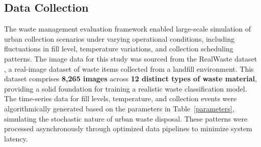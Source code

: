 \documentclass[final,5p,times,twocolumn]{elsarticle}
\begin{document}
\begin{table}[h!]
\centering
\caption{Smart Waste Management System Parameters}\label{parameters}
\end{table}


\subsection{Data Collection}
The waste management evaluation framework enabled large-scale simulation of urban collection scenarios under varying operational conditions, including fluctuations in fill level, temperature variations, and collection scheduling patterns. The image data for this study was sourced from the RealWaste dataset \cite{2024realimage}, a real-image dataset of waste items collected from a landfill environment. This dataset comprises \textbf{8,265 images} across \textbf{12 distinct types of waste material}, providing a solid foundation for training a realistic waste classification model. The time-series data for fill levels, temperature, and collection events were algorithmically generated based on the parameters in Table~\ref{parameters}, simulating the stochastic nature of urban waste disposal. These patterns were processed asynchronously through optimized data pipelines to minimize system latency.
\end{document}
